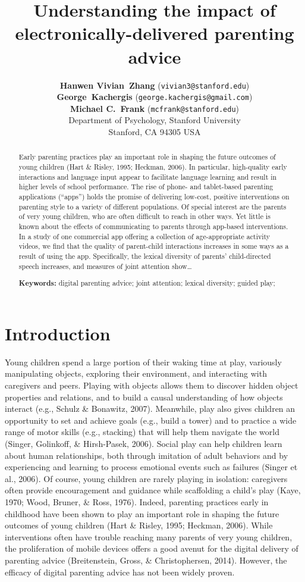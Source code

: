 \documentclass[10pt, letterpaper]{article}
\title{Understanding the impact of electronically-delivered parenting advice}
\author{{\large\bf Hanwen Vivian~Zhang} (\texttt{vivian3@stanford.edu}) \\ {\large\bf George~Kachergis} (\texttt{george.kachergis@gmail.com}) \\ {\large\bf Michael C.~Frank} (\texttt{mcfrank@stanford.edu}) \\  Department of Psychology, Stanford University \\  Stanford, CA 94305 USA}
\begin{document}
\maketitle

\begin{abstract}
Early parenting practices play an important role in shaping the future
outcomes of young children (Hart \& Risley, 1995; Heckman, 2006). In
particular, high-quality early interactions and language input appear to
facilitate language learning and result in higher levels of school
performance. The rise of phone- and tablet-based parenting applications
(``apps'') holds the promise of delivering low-cost, positive
interventions on parenting style to a variety of different populations.
Of special interest are the parents of very young children, who are
often difficult to reach in other ways. Yet little is known about the
effects of communicating to parents through app-based interventions. In
a study of one commercial app offering a collection of age-appropriate
activity videos, we find that the quality of parent-child interactions
increases in some ways as a result of using the app. Specifically, the
lexical diversity of parents' child-directed speech increases, and
measures of joint attention show\ldots{}

\textbf{Keywords:}
digital parenting advice; joint attention; lexical diversity; guided
play;
\end{abstract}

\section{Introduction}\label{introduction}

Young children spend a large portion of their waking time at play,
variously manipulating objects, exploring their environment, and
interacting with caregivers and peers. Playing with objects allows them
to discover hidden object properties and relations, and to build a
causal understanding of how objects interact (e.g., Schulz \& Bonawitz,
2007). Meanwhile, play also gives children an opportunity to set and
achieve goals (e.g., build a tower) and to practice a wide range of
motor skills (e.g., stacking) that will help them navigate the world
(Singer, Golinkoff, \& Hirsh-Pasek, 2006). Social play can help children
learn about human relationships, both through imitation of adult
behaviors and by experiencing and learning to process emotional events
such as failures (Singer et al., 2006). Of course, young children are
rarely playing in isolation: caregivers often provide encouragement and
guidance while scaffolding a child's play (Kaye, 1970; Wood, Bruner, \&
Ross, 1976). Indeed, parenting practices early in childhood have been
shown to play an important role in shaping the future outcomes of young
children (Hart \& Risley, 1995; Heckman, 2006). While interventions
often have trouble reaching many parents of very young children, the
proliferation of mobile devices offers a good avenut for the digital
delivery of parenting advice (Breitenstein, Gross, \& Christophersen,
2014). However, the efficacy of digital parenting advice has not been
widely proven.
\end{document}
